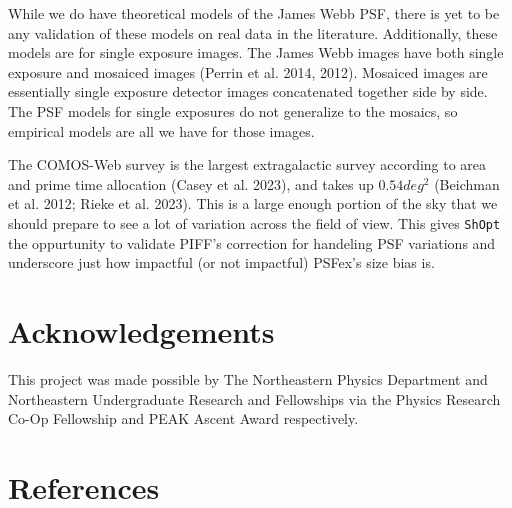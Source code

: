 \documentclass[
]{article}
\begin{document}
While we do have theoretical models of the James Webb PSF, there is yet
to be any validation of these models on real data in the literature.
Additionally, these models are for single exposure images. The James
Webb images have both single exposure and mosaiced images (Perrin et al.
2014, 2012). Mosaiced images are essentially single exposure detector
images concatenated together side by side. The PSF models for single
exposures do not generalize to the mosaics, so empirical models are all
we have for those images.

The COMOS-Web survey is the largest extragalactic survey according to
area and prime time allocation (Casey et al. 2023), and takes up
\(0.54 deg^2\) (Beichman et al. 2012; Rieke et al. 2023). This is a
large enough portion of the sky that we should prepare to see a lot of
variation across the field of view. This gives \texttt{ShOpt} the
oppurtunity to validate PIFF's correction for handeling PSF variations
and underscore just how impactful (or not impactful) PSFex's size bias
is.

\hypertarget{acknowledgements}{%
\section{Acknowledgements}\label{acknowledgements}}

This project was made possible by The Northeastern Physics Department
and Northeastern Undergraduate Research and Fellowships via the Physics
Research Co-Op Fellowship and PEAK Ascent Award respectively.

\hypertarget{references}{%
\section*{References}\label{references}}
\end{document}
